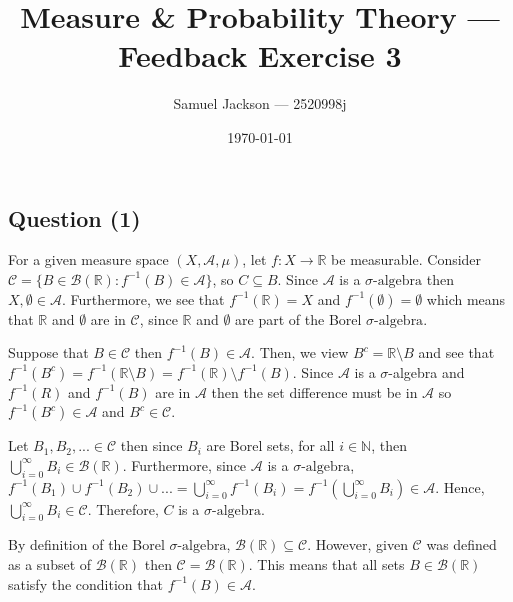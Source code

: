 \documentclass{article}
\title{Measure \& Probability Theory  --- Feedback Exercise 3}
\author{Samuel Jackson --- 2520998j}
\date{\today}
\begin{document}
\maketitle

\newcommand{\N}{\mathbb{N}}
\newcommand{\R}{\mathbb{R}}
\newcommand{\Z}{\mathbb{Z}}

\newcommand{\A}{\mathcal{A}}
\newcommand{\C}{\mathcal{C}}

\newcommand{\halfopen}[2]{\, [\frac{#1}{100},\frac{#2}{100}) \,}
\newcommand{\borel}{\mathcal{B}(\mathbb{R})}
\newcommand{\powerX}{\mathcal{P}(X)}
\newcommand{\infcup}{\bigcup_{j=0}^\infty}
\newcommand{\infsum}{\sum_{j=0}^\infty}

\newcommand{\salgebra}{\sigma\text{-algebra}}
\newcommand{\outerset}{\mathcal{M}_{\outermu}}
\newcommand{\outermu}{\mu^\ast}
\newcommand{\outerlamb}{\lambda^\ast}

\newcommand{\invf}{f^{-1}}
\newcommand{\invh}{h^{-1}}
\newcommand{\invg}{g^{-1}}



\begin{center}
\section*{Question (1)}
\end{center}

\begin{flushleft}
    For a given measure space $(X, \A, \mu)$, let $f : X \rightarrow \R$ be measurable. Consider $\C =\{ B \in \borel : \invf(B) \in \A \}$, so $C \subseteq B$. Since $\A$ is a $\salgebra$ then $X, \emptyset \in \A$. Furthermore, we see that $\invf(\R) = X$ and $\invf(\emptyset) = \emptyset$ which means that $\R$ and $\emptyset$ are in $\C$, since $\R$ and $\emptyset$ are part of the Borel $\salgebra$. \newline 

    Suppose that $B \in \C$ then $\invf(B) \in \A$. Then, we view $B^c = \R \setminus B$ and see that $\invf(B^c) = \invf(\R \setminus B) = \invf(\R) \setminus \invf(B)$. Since $\A$ is a $\sigma$-algebra and $\invf(R)$ and $\invf(B)$ are in $\A$ then the set difference must be in $\A$ so $\invf(B^c) \in \A$ and $B^c \in \C$. \newline

    Let $B_1, B_2, ... \in \C$ then since $B_i$ are Borel sets, for all $i \in \N$, then $\bigcup_{i=0}^\infty B_i \in \borel$. Furthermore, since $\A$ is a $\salgebra$, $\invf(B_1) \cup \invf(B_2) \cup ... = \bigcup_{i=0}^\infty \invf(B_i) = \invf(\bigcup_{i=0}^\infty B_i) \in \A$. Hence, $\bigcup_{i=0}^\infty B_i \in \C$. Therefore, $C$ is a $\salgebra$. \newline

    By definition of the Borel $\salgebra$, $\borel \subseteq \C$. However, given $\C$ was defined as a subset of $\borel$ then $\C = \borel$. This means that all sets $B \in \borel$ satisfy the condition that $\invf(B) \in \A$.
\end{flushleft}
\end{document}
